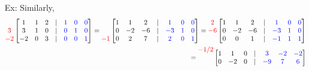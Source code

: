 \documentclass[reqno]{amsart}
\theoremstyle{definition}
\begin{document}
\begin{enumerate}
\item[Ex:  ]  Similarly,
%
\begin{align*}
\begin{matrix}
\\
{\color{red}3}\\
{\color{red}-2}
\end{matrix}
\begin{bmatrix}
1 & 1 & 2 & | & {\color{blue}1} & {\color{blue}0} & {\color{blue}0}\\
3 & 1 & 0 & | & {\color{blue}0} & {\color{blue}1} & {\color{blue}0}\\
-2 & 0 & 3 & | & {\color{blue}0} & {\color{blue}0} & {\color{blue}1}
\end{bmatrix} = \begin{matrix}
\\
\\
{\color{red}-1}
\end{matrix}\begin{bmatrix}
1 & 1 & 2 & | & {\color{blue}1} & {\color{blue}0} & {\color{blue}0}\\
0 & -2 & -6 & | & {\color{blue}-3} & {\color{blue}1} & {\color{blue}0}\\
0 & 2 & 7 & | & {\color{blue}2} & {\color{blue}0} & {\color{blue}1}
\end{bmatrix} = \begin{matrix}
{\color{red}2}\\
{\color{red}-6}\\
\\
\end{matrix}\begin{bmatrix}
1 & 1 & 2 & | & {\color{blue}1} & {\color{blue}0} & {\color{blue}0}\\
0 & -2 & -6 & | & {\color{blue}-3} & {\color{blue}1} & {\color{blue}0}\\
0 & 0 & 1 & | & {\color{blue}-1} & {\color{blue}1} & {\color{blue}1}
\end{bmatrix}\\
= \begin{matrix}
{\color{red}-1/2}\\
\\
\\
\end{matrix}\begin{bmatrix}
1 & 1 & 0 & | & {\color{blue}3} & {\color{blue}-2} & {\color{blue}-2}\\
0 & -2 & 0 & | & {\color{blue}-9} & {\color{blue}7} & {\color{blue}6}\\

\end{bmatrix}
\end{align*}
\end{enumerate}
\end{document}

